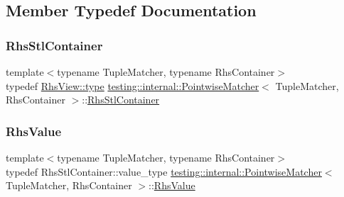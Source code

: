 \subsection{Member Typedef Documentation}
\mbox{\label{classtesting_1_1internal_1_1_pointwise_matcher_aadbaec8c93351f29b103816c2e397edd}} 
\subsubsection{\texorpdfstring{Rhs\+Stl\+Container}{RhsStlContainer}}
{\footnotesize\ttfamily template$<$typename Tuple\+Matcher, typename Rhs\+Container$>$ \\
typedef \hyperlink{classtesting_1_1internal_1_1_stl_container_view_a2b2c63a6dcdbfe63fb0ee121ebf463ba}{Rhs\+View\+::type} \hyperlink{classtesting_1_1internal_1_1_pointwise_matcher}{testing\+::internal\+::\+Pointwise\+Matcher}$<$ Tuple\+Matcher, Rhs\+Container $>$\+::\hyperlink{classtesting_1_1internal_1_1_pointwise_matcher_aadbaec8c93351f29b103816c2e397edd}{Rhs\+Stl\+Container}}

\mbox{\label{classtesting_1_1internal_1_1_pointwise_matcher_a9f7f1abbfa795033e1e1c1df385b4617}} 
\subsubsection{\texorpdfstring{Rhs\+Value}{RhsValue}}
{\footnotesize\ttfamily template$<$typename Tuple\+Matcher, typename Rhs\+Container$>$ \\
typedef Rhs\+Stl\+Container\+::value\+\_\+type \hyperlink{classtesting_1_1internal_1_1_pointwise_matcher}{testing\+::internal\+::\+Pointwise\+Matcher}$<$ Tuple\+Matcher, Rhs\+Container $>$\+::\hyperlink{classtesting_1_1internal_1_1_pointwise_matcher_a9f7f1abbfa795033e1e1c1df385b4617}{Rhs\+Value}}

\mbox{\label{classtesting_1_1internal_1_1_pointwise_matcher_a215d397bfaf0f8bc948cb7b5ff9100c9}} 
